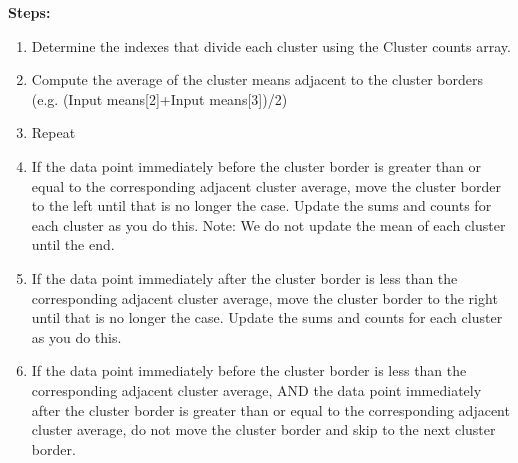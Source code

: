 \documentclass[conference,compsoc]{IEEEtran}
\begin{document}
\noindent{}
\vspace{15px}

\textbf{Steps:}
\begin{enumerate}
    \item Determine the indexes that divide each cluster using the Cluster counts array.
    \item Compute the average of the cluster means adjacent to the cluster borders (e.g. (Input means[2]+Input means[3])/2)
    \item Repeat
    \item If the data point immediately before the cluster border is greater than or equal to the corresponding adjacent cluster average, move the cluster border to the left until that is no longer the case. Update the sums and counts for each cluster as you do this. Note: We do not update the mean of each cluster until the end.
    \item If the data point immediately after the cluster border is less than the corresponding adjacent cluster average, move the cluster border to the right until that is no longer the case. Update the sums and counts for each cluster as you do this.
    \item If the data point immediately before the cluster border is less than the corresponding adjacent cluster average, AND the data point immediately after the cluster border is greater than or equal to the corresponding adjacent cluster average, do not move the cluster border and skip to the next cluster border.
\end{enumerate}
\end{document}
